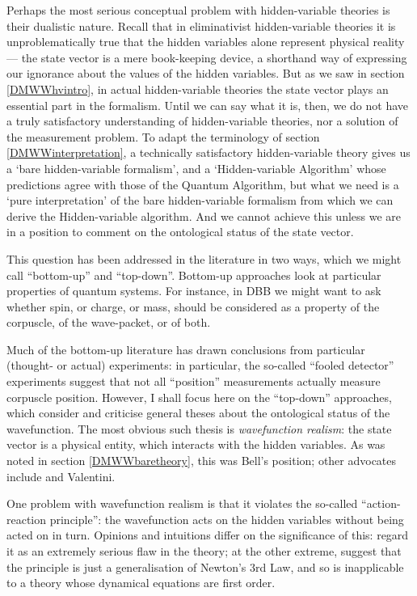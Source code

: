 \documentclass[12pt]{article}
\begin{document}
Perhaps the most serious conceptual problem with hidden-variable theories is their dualistic nature. Recall that in eliminativist hidden-variable theories it is unproblematically true that the hidden variables alone represent physical reality --- the state vector is a mere book-keeping device, a shorthand way of expressing our ignorance about the values of the hidden variables.  But as we saw in section \ref{DMWWhvintro}, in actual hidden-variable theories the state vector plays an essential part in the formalism. Until we can say what it is, then, we do not have a truly satisfactory understanding of hidden-variable theories, nor a solution of the measurement problem. To adapt the terminology of section \ref{DMWWinterpretation}, a technically satisfactory hidden-variable theory gives us a `bare hidden-variable formalism', and a `Hidden-variable Algorithm' whose predictions agree with those of the Quantum Algorithm, but what we need is a `pure interpretation' of the bare hidden-variable formalism from which we can derive the Hidden-variable algorithm. And we cannot achieve this unless we are in a position to comment on the ontological status of the state vector.

This question has been addressed in the literature in two ways, which we might call ``bottom-up''  and ``top-down''.  Bottom-up approaches look at particular properties of quantum systems. For instance, in DBB we might want to ask whether spin, or charge, or mass, should be considered as a property of the corpuscle, of the wave-packet, or of both. 

Much of the bottom-up literature has drawn conclusions from particular (thought- or actual) experiments: in particular, the so-called ``fooled detector'' experiments \cite{englertetal,dewdneyetal,brownfooleddetectors,aharonovvaidman,hileyfooleddetectors} suggest that not all ``position'' measurements actually measure corpuscle position. However, I shall focus here on the ``top-down'' approaches, which consider and criticise general theses about the ontological status of the wavefunction. The most obvious such thesis is \emph{wavefunction realism}: the state vector is a physical entity, which interacts with the hidden variables. As was noted in section \ref{DMWWbaretheory}, this was Bell's position; other advocates include  and Valentini.

One problem with wavefunction realism is that it violates the so-called ``action-reaction principle'': the wavefunction acts on the hidden variables without being acted on in turn. Opinions and intuitions differ on the significance of this:  regard it as an extremely serious flaw in the theory; at the other extreme,  suggest that the  principle is just a generalisation of Newton's 3rd Law, and so is inapplicable to a theory whose dynamical equations are first order.
\end{document}
